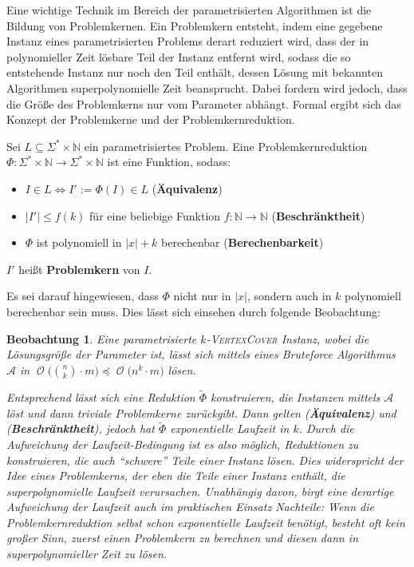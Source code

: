 \documentclass[a4paper,ngerman]{atseminar}
\newcommand{\N}{\ensuremath{\mathbb{N}}\xspace}
\newcommand{\BigO}[1]{\ensuremath{\operatorname{\mathcal{O}}\bigl(#1\bigr)}\xspace}
\newtheorem{observation}[theorem]{\textbf{Beobachtung}}
\begin{document}
Eine wichtige Technik im Bereich der parametrisierten Algorithmen ist die Bildung von Problemkernen.
Ein Problemkern entsteht, indem eine gegebene Instanz eines parametrisierten Problems derart reduziert wird, dass der in polynomieller Zeit lösbare
Teil der Instanz entfernt wird, sodass die so entstehende Instanz nur noch den Teil enthält, dessen Lösung mit bekannten Algorithmen superpolynomielle Zeit beansprucht.
\noindent
Dabei fordern wird jedoch, dass die Größe des Problemkerns nur vom Parameter abhängt.
Formal ergibt sich das Konzept der Problemkerne und der Problemkernreduktion.

\begin{definition}
  \label{OE:def:kernel}
  Sei $L  \subseteq \Sigma^* \times \N$ ein parametrisiertes Problem.
  Eine Problemkernreduktion $ \Phi: \Sigma^* \times \N \rightarrow \Sigma^* \times \N $ ist eine Funktion, sodass:
  \begin{itemize}
      \item $I \in L \iff I' := \Phi(I) \in L $ (\textbf{Äquivalenz})
      \item $|I'| \leq f(k)$ für eine beliebige Funktion $f: \N \rightarrow \N$ (\textbf{Beschränktheit})
      \item $\Phi$ ist polynomiell in $|x| + k$ berechenbar (\textbf{Berechenbarkeit})
  \end{itemize}

  \noindent
  $I'$ heißt \textbf{Problemkern} von $I$.
\end{definition}

\noindent
Es sei darauf hingewiesen, dass $\Phi$ nicht nur in $|x|$, sondern auch in $k$ polynomiell berechenbar sein muss.
Dies lässt sich einsehen durch folgende Beobachtung:
\begin{observation}

  Eine parametrisierte $k$-\textsc{VertexCover} Instanz, wobei die Lösungsgröße der Parameter ist, lässt sich mittels eines
  Bruteforce Algorithmus $\mathcal{A}$ in $\BigO{\binom{n}{k} \cdot m} \preceq \BigO{n^k \cdot m}$ lösen.

  \noindent
  Entsprechend lässt sich eine Reduktion $\tilde{\Phi}$ konstruieren, die Instanzen mittels $\mathcal{A}$ löst und dann triviale
  Problemkerne zurückgibt.
  Dann gelten (\textbf{Äquivalenz}) und (\textbf{Beschränktheit}), jedoch hat $\tilde{\Phi}$ exponentielle Laufzeit in $k$.
  \noindent
  Durch die Aufweichung der Laufzeit-Bedingung ist es also möglich, Reduktionen zu konstruieren, die auch \enquote{schwere} Teile einer Instanz lösen.
  Dies widerspricht der Idee eines Problemkerns, der eben die Teile einer Instanz enthält, die superpolynomielle Laufzeit verursachen.
  Unabhängig davon, birgt eine derartige Aufweichung der Laufzeit auch im praktischen Einsatz Nachteile: Wenn die Problemkernreduktion selbst
  schon exponentielle Laufzeit benötigt, besteht oft kein großer Sinn, zuerst einen Problemkern zu berechnen und diesen dann in superpolynomieller Zeit
  zu lösen.
\end{observation}
\end{document}
